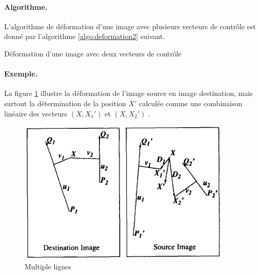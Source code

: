 \paragraph{Algorithme.} L'algorithme de déformation d'une image avec plusieurs vecteurs de contrôle est donné par l'algorithme \ref{algo:deformation2} suivant.
\begin{algorithm}[h!]
    \caption{Déformation d'une image avec deux vecteurs de contrôle \cite{beier1992feature}}
    \label{algo:deformation2}
    \BlankLine
\end{algorithm}
\paragraph{Exemple.} La figure \ref{fig:mulLi} illustre la déformation de l'image source en image destination, mais surtout la détermination de la 
position $X'$ calculée comme une combinaison linéaire des vecteurs $(X,X_1')$ et $(X,X_2')$ \cite{beier1992feature}.
\begin{figure}[h!]
    \centering
    \includegraphics[width=0.8\linewidth]{img/p3/multiple.png}
    \caption{Multiple lignes \cite{beier1992feature}}
    \label{fig:mulLi}
\end{figure}

